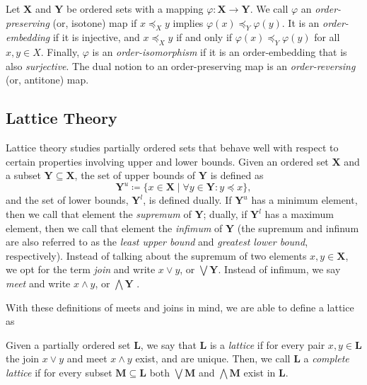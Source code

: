 \begin{definition}
  \label{definition:order-maps}

       
  Let $\mathbf{X}$ and $\mathbf{Y}$ be ordered sets with a mapping $\varphi : \mathbf{X} \to \mathbf{Y}$. We call $\varphi$ an \textit{order-preserving} (or, isotone) map if $x \preceq_X y$ implies $\varphi(x) \preceq_Y \varphi(y)$. It is an \textit{order-embedding} if it is injective, and $x \preceq_X y$ if and only if $\varphi(x) \preceq_Y \varphi(y)$ for all $x,y \in X$. Finally, $\varphi$ is an \textit{order-isomorphism} if it is an order-embedding that is also \textit{surjective}. The dual notion to an order-preserving map is an \textit{order-reversing} (or, antitone) map. 
\end{definition}

\subsection{Lattice Theory}
\label{subsection:lattice-theory}
Lattice theory studies partially ordered sets that behave well with respect to certain properties involving upper and lower bounds. Given an ordered set $\mathbf{X}$ and a subset $\mathbf{Y} \subseteq \mathbf{X}$, the set of upper bounds of $\mathbf{Y}$ is defined as
\[
  \mathbf{Y}^u \coloneqq \{x \in \mathbf{X} \mid \forall y \in \mathbf{Y} : y \preceq x\},
\]
and the set of lower bounds, $\mathbf{Y}^l$, is defined dually. If $\mathbf{Y}^u$ has a minimum element, then we call that element the \textit{supremum} of $\mathbf{Y}$; dually, if $\mathbf{Y}^l$ has a maximum element, then we call that element the \textit{infimum} of $\mathbf{Y}$ (the supremum and infinum are also referred to as the \textit{least upper bound} and \textit{greatest lower bound}, respectively). Instead of talking about the supremum of two elements $x,y \in \mathbf{X}$, we opt for the term \textit{join} and write $x \vee y$, or $\bigvee \mathbf{Y}$. Instead of infimum, we say \textit{meet} and write $x \wedge y$, or $\bigwedge \mathbf{Y}$ \cite[p. 33]{davey2002introduction}. 

   

With these definitions of meets and joins in mind, we are able to define a lattice as 

\begin{definition}
     \label{definition:lattice}
Given a partially ordered set $\mathbf{L}$, we say that $\mathbf{L}$ is a \textit{lattice} if for every pair $x,y \in \mathbf{L}$ the join $x \vee y$ and meet $x \wedge y$ exist, and are unique. Then, we call $\mathbf{L}$ a \textit{complete lattice} if for every subset $\mathbf{M} \subseteq \mathbf{L}$ both $\bigvee \mathbf{M}$ and $\bigwedge \mathbf{M}$ exist in $\mathbf{L}$.
\end{definition}

